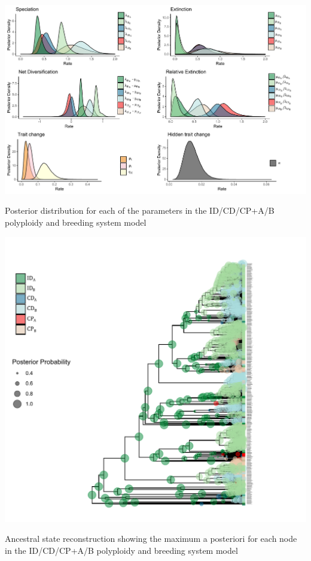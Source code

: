 \begin{suppfigure}
\includegraphics[width=\textwidth]{muhisseDPSInodipposteriordist.pdf}
\caption{Posterior distribution for each of the parameters in the ID/CD/CP+A/B polyploidy and breeding system model} %
\label{suppfigure:IDCDCPnodipAB}
\end{suppfigure}

\begin{suppfigure}
\includegraphics[width=\textwidth]{asrIDCDCPAB.pdf}
\caption{Ancestral state reconstruction showing the maximum a posteriori for each node in the ID/CD/CP+A/B polyploidy and breeding system model} %
\label{suppfigure:IDCDCPnodipABasr}
\end{suppfigure}

